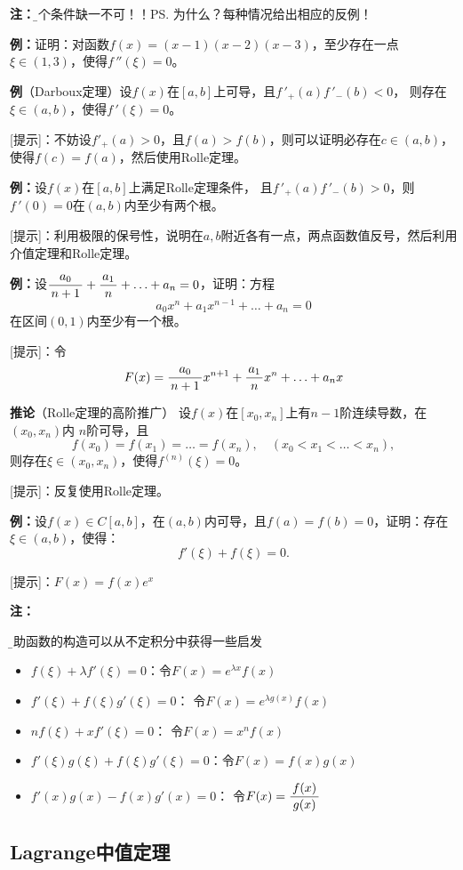 {\bf 注：}{\b 三个条件缺一不可！！}\ps{为什么？每种情况给出相应的反例！}

{\bf 例：}证明：对函数$f(x)=(x-1)(x-2)(x-3)$，至少存在一点
$\xi\in(1,3)$，使得$f\,''(\xi)=0$。

{\bf 例}（Darboux定理）设$f(x)$在$[a,b]$上可导，且$f\,'_+(a)f\,'_-(b)<0$，
则存在$\xi\in(a,b)$，使得$f\,'(\xi)=0$。

[提示]：不妨设$f'_+(a)>0$，且$f(a)>f(b)$，则可以证明必存在$c\in(a,b)$，
使得$f(c)=f(a)$，然后使用Rolle定理。

{\bf 例：}设$f(x)$在$[a,b]$上满足Rolle定理条件，
且$f\,'_+(a)f\,'_-(b)>0$，则$f\,'(0)=0$在$(a,b)$内至少有两个根。

[提示]：利用极限的保号性，说明在$a,b$附近各有一点，两点函数值反号，然后利用
介值定理和Rolle定理。

{\bf 例：}设$\displaystyle\frac{\,{a_0}\,}{\,{n+1}\,}+\displaystyle\frac{\,{a_1}\,}{\,{n}\,}+\ldots+a_n=0$，证明：方程
$$a_0x^n+a_1x^{n-1}+\ldots+a_n=0$$
在区间$(0,1)$内至少有一个根。

[提示]：令
$$F(x)=\displaystyle\frac{\,{a_0}\,}{\,{n+1}\,}x^{n+1}+\displaystyle\frac{\,{a_1}\,}{\,{n}\,}x^n+\ldots+a_nx$$

{\bf 推论}（Rolle定理的高阶推广）
设$f(x)$在$[x_0,x_n]$上有$n-1$阶连续导数，在$(x_0,x_n)$内
$n$阶可导，且
$$f(x_0)=f(x_1)=\ldots=f(x_n),\quad(x_0<x_1<\ldots<x_n),$$
则存在$\xi\in(x_0,x_n)$，使得$f^{(n)}(\xi)=0$。

[提示]：反复使用Rolle定理。

{\bf 例：}设$f(x)\in C[a,b]$，在$(a,b)$内可导，且$f(a)=f(b)=0$，证明：存在
$\xi\in(a,b)$，使得：
$$f'(\xi)+f(\xi)=0.$$

[提示]：$F(x)=f(x)e^x$

{\bf 注：}{\b 辅助函数的构造可以从不定积分中获得一些启发
\begin{itemize}
  \setlength{\itemindent}{1cm}
  \item $f(\xi)+\lambda f'(\xi)=0$：令$F(x)=e^{\lambda x}f(x)$
  \item $f'(\xi)+f(\xi)g'(\xi)=0$： 令$F(x)=e^{\lambda g(x)}f(x)$
  \item $nf(\xi)+xf'(\xi)=0$： 令$F(x)=x^nf(x)$ 
  \item $f'(\xi)g(\xi)+f(\xi)g'(\xi)=0$：令$F(x)=f(x)g(x)$
  \item $f'(x)g(x)-f(x)g'(x)=0$： 令$F(x)=\displaystyle\frac{\,{f(x)}\,}{\,{g(x)}\,}$
\end{itemize}
}


\subsection{Lagrange中值定理}

